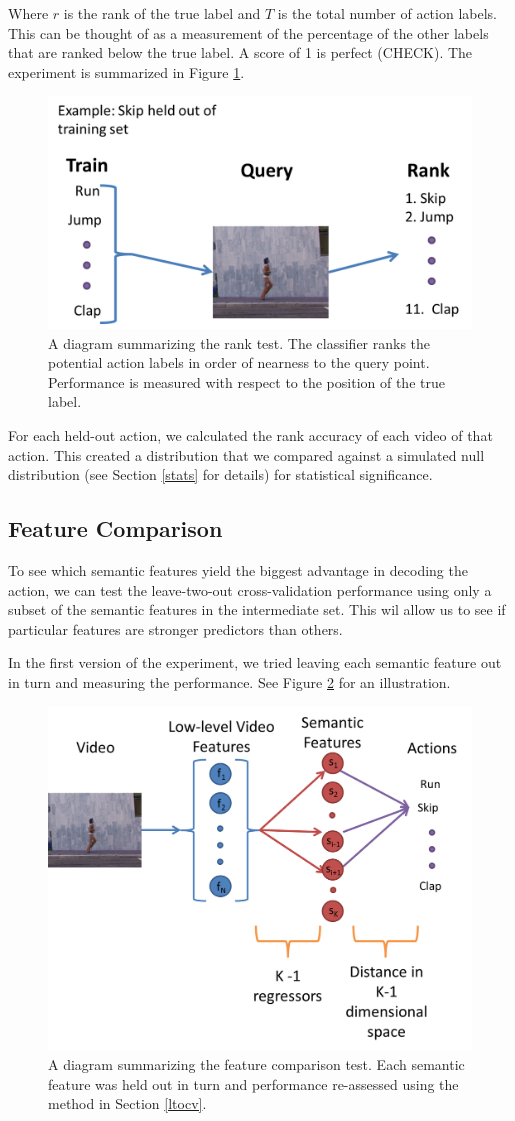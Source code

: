 \documentclass{article}
\begin{document}
Where $r$ is the rank of the true label and $T$ is the total number of action labels.  This can be thought of as a measurement of the percentage of the other labels that are ranked below the true label. A score of 1 is perfect (CHECK). The experiment is summarized in Figure \ref{ranking}.

\begin{figure}[h]
  \centering
  \includegraphics[width = .45\linewidth]{ranking}
  \caption{A diagram summarizing the rank test. The classifier ranks the potential action labels in order of nearness to the query point. Performance is measured with respect to the position of the true label.}
  \label{ranking}
\end{figure}
\label{rank}

For each held-out action, we calculated the rank accuracy of each video of that action. This created a distribution that we compared against a simulated null distribution (see Section \ref{stats} for details) for statistical significance.

\subsection{Feature Comparison}
To see which semantic features yield the biggest advantage in decoding the action, we can test the leave-two-out cross-validation performance using only a subset of the semantic features in the intermediate set. This wil allow us to see if particular features are stronger predictors than others.

In the first version of the experiment, we tried leaving each semantic feature out in turn and measuring the performance. See Figure \ref{feature} for an illustration.

\begin{figure}[h]
  \centering
  \includegraphics[width = .45\linewidth]{features}
  \caption{A diagram summarizing the feature comparison test. Each semantic feature was held out in turn and performance re-assessed using the method in Section \ref{ltocv}.}
  \label{feature}
\end{figure}
\end{document}
